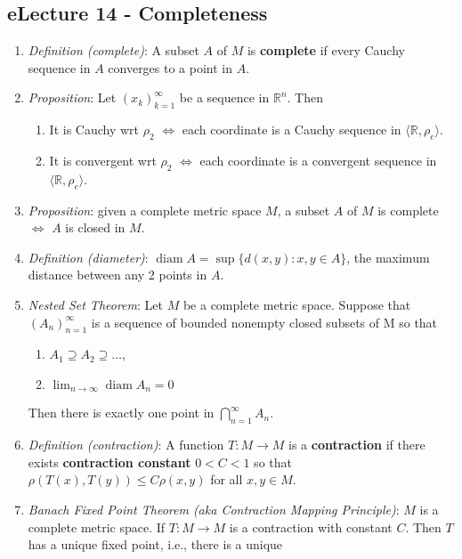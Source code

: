 \message{ !name(cheatsheet.tex)}\documentclass{article}
\DeclareMathOperator{\diam}{diam}
\begin{document}
\begin{multicols*}{3}
	\section{eLecture 14 - Completeness}
	\begin{enumerate}
		\item \emph{Definition (complete)}: A subset \(A\) of \(M\) is \textbf{complete} if every Cauchy
		      sequence in \(A\) converges to a point in \(A\).
		\item \emph{Proposition}: Let \((x_k)^\infty_{k=1}\) be a sequence in \(\mathbb{R}^n\).
		      Then
		      \begin{enumerate}
			      \item It is Cauchy wrt \(\rho_2\) \(\iff\) each coordinate is a Cauchy
			            sequence in \(\langle\mathbb{R},\rho_e\rangle\).
			      \item It is convergent wrt \(\rho_2\) \(\iff\) each coordinate is a convergent
			            sequence in \(\langle\mathbb{R},\rho_e\rangle\).
		      \end{enumerate}
		\item \emph{Proposition}: given a complete metric space \(M\), a subset \(A\) of \(M\)
		      is complete \(\iff\) \(A\) is closed in \(M\).
		\item \emph{Definition (diameter)}: \(\diam A = \sup\{d(x,y):x,y\in A\}\), the maximum
		      distance between any 2 points in \(A\).
		\item \emph{Nested Set Theorem}: Let \(M\) be a complete metric space. Suppose that
		      \((A_n)^\infty_{n=1}\) is a sequence of bounded nonempty closed subsets of M
		      so that
		      \begin{enumerate}
			      \item \(A_1 \supseteq A_2 \supseteq \dots\),
			      \item \(\lim_{n\rightarrow\infty} \diam A_n = 0\)
		      \end{enumerate}
		      Then there is exactly one point in \(\bigcap^\infty_{n=1}A_n\).
		\item \emph{Definition (contraction)}: A function \(T:M\rightarrow M\) is a
		      \textbf{contraction} if there exists \textbf{contraction constant} \(0<C<1\) so that
		      \(\rho(T(x),T(y))\leq C\rho(x,y)\) for all \(x,y\in M\).
		\item \emph{Banach Fixed Point Theorem (aka Contraction Mapping Principle)}: \(M\) is a
		      complete metric space. If \(T:M\rightarrow M\) is a contraction with
		      constant \(C\). Then \(T\) has a unique fixed point, i.e., there is a unique

\end{enumerate}
\end{multicols*}
\end{document}
